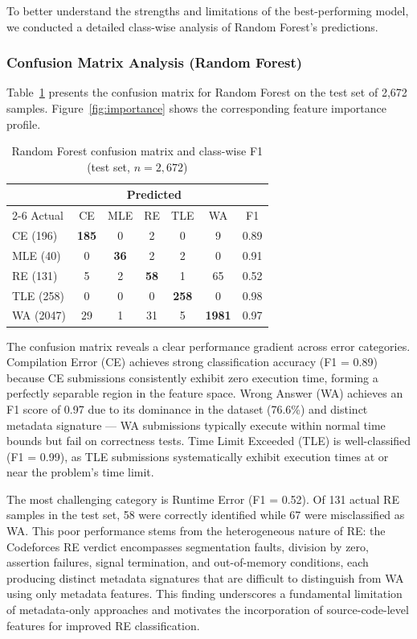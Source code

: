\documentclass[10pt,letterpaper]{article}
\begin{document}
To better understand the strengths and limitations of the best-performing
model, we conducted a detailed class-wise analysis of Random Forest's
predictions.

\subsubsection*{Confusion Matrix Analysis (Random Forest)}

Table~\ref{tab:rf-cm} presents the confusion matrix for Random Forest on the
test set of 2,672 samples. Figure~\ref{fig:importance} shows the corresponding
feature importance profile.

\begin{table}[htbp]
\centering
\caption{Random Forest confusion matrix and class-wise F1 (test set, $n=2{,}672$)}
\label{tab:rf-cm}
\begin{tabular}{@{}lccccc|c@{}}
\toprule
& \multicolumn{5}{c}{Predicted} & \\
\cmidrule{2-6}
Actual & CE & MLE & RE & TLE & WA & F1 \\
\midrule
CE (196)  & \textbf{185}  & 0   & 2   & 0   & 9   & 0.89 \\
MLE (40)  & 0   & \textbf{36}   & 2   & 2   & 0   & 0.91 \\
RE (131)  & 5   & 2   & \textbf{58} & 1   & 65  & 0.52 \\
TLE (258) & 0   & 0   & 0   & \textbf{258} & 0   & 0.98 \\
WA (2047) & 29  & 1   & 31  & 5   & \textbf{1981} & 0.97 \\
\bottomrule
\end{tabular}
\end{table}

The confusion matrix reveals a clear performance gradient across error
categories. Compilation Error (CE) achieves strong classification accuracy (F1 =
0.89) because CE submissions consistently exhibit zero execution time, forming a perfectly separable region in the
feature space. Wrong Answer (WA) achieves an F1 score of 0.97 due to
its dominance in the dataset (76.6\%) and distinct metadata signature --- WA
submissions typically execute within normal time bounds but fail on correctness tests.
Time Limit Exceeded (TLE) is well-classified (F1 = 0.99), as TLE submissions
systematically exhibit execution times at or near the problem's time limit.

The most challenging category is Runtime Error (F1 = 0.52). Of 131 actual RE samples in the test set, 58 were correctly identified while 67 were misclassified as WA. This poor performance stems from the
heterogeneous nature of RE: the Codeforces RE verdict encompasses segmentation
faults, division by zero, assertion failures, signal termination, and
out-of-memory conditions, each producing distinct metadata signatures
that are difficult to distinguish from WA using only metadata features.
This finding underscores a fundamental limitation of metadata-only approaches
and motivates the incorporation of source-code-level features for improved RE
classification.
\end{document}
